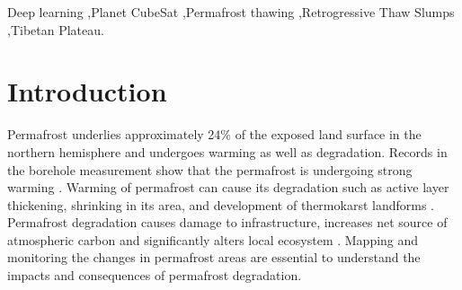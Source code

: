\documentclass[preprint,12pt,authoryear]{elsarticle}
\begin{document}
\begin{frontmatter}
\begin{abstract}
\end{abstract}

\begin{keyword}


Deep learning \sep Planet CubeSat  \sep Permafrost thawing  \sep Retrogressive Thaw Slumps \sep Tibetan Plateau.

\end{keyword}

\end{frontmatter}


\section{Introduction}
\label{sec_intro}

Permafrost underlies approximately 24\% of the exposed land surface in the northern hemisphere \citep{zhang_statistics_1999} and undergoes warming as well as degradation. Records in the borehole measurement show that the permafrost is undergoing strong warming \citep{marchenko_permafrost_2007,osterkamp2005recent,romanovsky_thermal_2010,romanovsky_permafrost_2010,wu_recent_2008,zhao_thermal_2010}. Warming of permafrost can cause its degradation such as active layer thickening, shrinking in its area, and development of thermokarst landforms \citep{zhao_thermal_2010,akerman_thawing_2008,czudek_thermokarst_1970,jorgenson_response_2005,osterkamp_characteristics_2007}. Permafrost degradation causes damage to infrastructure, increases net source of atmospheric carbon and significantly alters local ecosystem \citep{tong_effect_1996,grosse_vulnerability_2011,olefeldt_circumpolar_2016,schuur_climate_2015,tarnocai_soil_2009,schuster2018permafrost}. Mapping and monitoring the changes in permafrost areas are essential to understand the impacts and consequences of permafrost degradation. 
\end{document}
